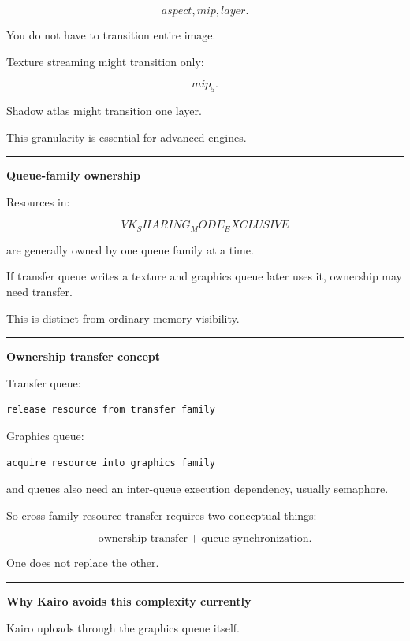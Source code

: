 \[
aspect,
mip,
layer.
\]

You do not have to transition entire image.

Texture streaming might transition only:

\[
mip_5.
\]

Shadow atlas might transition one layer.

This granularity is essential for advanced engines.

\begin{center}\rule{0.5\linewidth}{0.5pt}\end{center}

\textbf{Queue-family ownership}

Resources in:

\[
VK_SHARING_MODE_EXCLUSIVE
\]

are generally owned by one queue family at a time.

If transfer queue writes a texture and graphics queue later uses it, ownership may need transfer.

This is distinct from ordinary memory visibility.

\begin{center}\rule{0.5\linewidth}{0.5pt}\end{center}

\textbf{Ownership transfer concept}

Transfer queue:

\begin{verbatim}
release resource from transfer family
\end{verbatim}

Graphics queue:

\begin{verbatim}
acquire resource into graphics family
\end{verbatim}

and queues also need an inter-queue execution dependency, usually semaphore.

So cross-family resource transfer requires two conceptual things:

\[
\boxed{
\text{ownership transfer}
+
\text{queue synchronization}.
}
\]

One does not replace the other.

\begin{center}\rule{0.5\linewidth}{0.5pt}\end{center}

\textbf{Why Kairo avoids this complexity currently}

Kairo uploads through the graphics queue itself.

